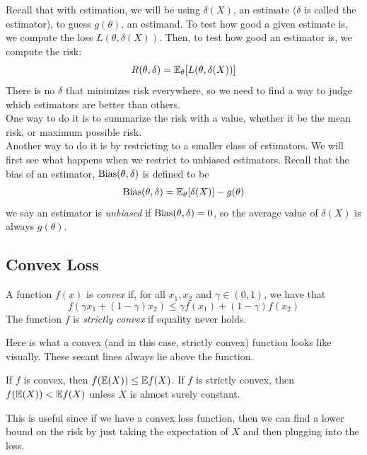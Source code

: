 
Recall that with estimation, we will be using $\delta(X)$, an estimate ($\delta$ is called the estimator), to guess $g(\theta)$, an estimand. To test how good a given estimate is, we compute the loss $L(\theta, \delta(X))$. Then, to test how good an estimator is, we compute the risk:
\[ R(\theta, \delta) = \bb{E}_{\theta}[L(\theta, \delta(X))] \]
There is no $\delta$ that minimizes risk everywhere, so we need to find a way to judge which estimators are better than others.\\

One way to do it is to summarize the risk with a value, whether it be the mean risk, or maximum possible risk.\\

Another way to do it is by restricting to a smaller class of estimators. We will first see what happens when we restrict to unbiased estimators. Recall that the bias of an estimator, $\tt{Bias}(\theta, \delta)$ is defined to be
\[ \tt{Bias}(\theta, \delta) = \bb{E}_{\theta}[\delta(X)] - g(\theta) \]
we say an estimator is \emph{unbiased} if $\tt{Bias}(\theta, \delta) = 0$, so the average value of $\delta(X)$ is always $g(\theta)$.

\subsection*{Convex Loss}

\begin{definition}
    A function $f(x)$ is \emph{convex} if, for all $x_1, x_2$ and $\gamma \in (0, 1)$, we have that
    \[ f(\gamma x_1 + (1 - \gamma)x_2) \leq \gamma f(x_1) + (1 - \gamma) f(x_2) \]
    The function $f$ is \emph{strictly convex} if equality never holds.
\end{definition}
Here is what a convex (and in this case, strictly convex) function looks like visually. These secant lines always lie above the function.

\begin{theorem}
    If $f$ is convex, then $f(\bb{E}(X)) \leq \bb{E}f(X)$. If $f$ is strictly convex, then $f(\bb{E}(X)) < \bb{E}f(X)$ unless $X$ is almost surely constant. 
\end{theorem}

This is useful since if we have a convex loss function, then we can find a lower bound on the risk by just taking the expectation of $X$ and then plugging into the loss.\\

